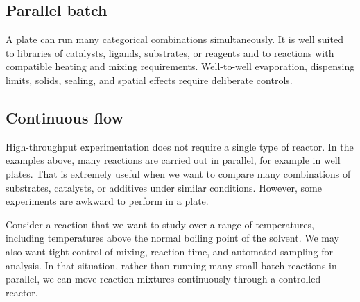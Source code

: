 \subsection{Parallel batch}

A plate can run many categorical combinations simultaneously.
It is well suited to libraries of catalysts, ligands, substrates, or reagents and to reactions with compatible heating and mixing requirements.
Well-to-well evaporation, dispensing limits, solids, sealing, and spatial effects require deliberate controls.

\subsection{Continuous flow}

High-throughput experimentation does not require a single type of reactor. In the examples above, many reactions are carried out in parallel, for example in well plates. That is extremely useful when we want to compare many combinations of substrates, catalysts, or additives under similar conditions. However, some experiments are awkward to perform in a plate.

Consider a reaction that we want to study over a range of temperatures, including temperatures above the normal boiling point of the solvent. We may also want tight control of mixing, reaction time, and automated sampling for analysis. In that situation, rather than running many small batch reactions in parallel, we can move reaction mixtures continuously through a controlled reactor.


